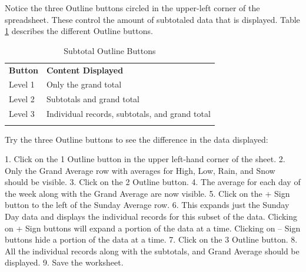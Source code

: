 Notice the three Outline buttons circled in the upper-left corner of the spreadsheet. These control the amount of subtotaled data that is displayed. Table \ref{05:tab06} describes the different Outline buttons.

{\small
	\begin{longtable}{p{0.50in}p{3.00in}} %
		\textbf{Button} & \textbf{Content Displayed} \endhead
		\hline \\
		Level 1 & Only the grand total\\
		Level 2 & Subtotals and grand total\\
		Level 3 & Individual records, subtotals, and grand total\\
		\caption{Subtotal Outline Buttons}
		\label{05:tab06}
	\end{longtable}
}


Try the three Outline buttons to see the difference in the data displayed:

1. Click on the 1 Outline button in the upper left-hand corner of the sheet.
2. Only the Grand Average row with averages for High, Low, Rain, and Snow should be visible.
3. Click on the 2 Outline button.
4. The average for each day of the week along with the Grand Average are now visible.
5. Click on the + Sign button to the left of the Sunday Average row.
6. This expands just the Sunday Day data and displays the individual records for this subset of the data. Clicking on + Sign buttons will expand a portion of the data at a time. Clicking on – Sign buttons hide a portion of the data at a time.
7. Click on the 3 Outline button.
8. All the individual records along with the subtotals, and Grand Average should be displayed. 
9. Save the worksheet.

